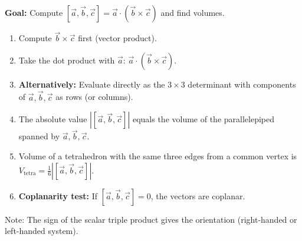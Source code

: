 \documentclass[11pt]{article}
\newcommand{\cle}[1]{{\popxbold\color{popdark}#1}}
\begin{document}
\begin{methode}
\textbf{Goal:} Compute $[\vec{a},\vec{b},\vec{c}]=\vec{a}\cdot(\vec{b}\times\vec{c})$ and find volumes.
\begin{enumerate}
\item Compute $\vec{b}\times\vec{c}$ first (vector product).
\item Take the dot product with $\vec{a}$: $\vec{a}\cdot(\vec{b}\times\vec{c})$.
\item \textbf{Alternatively:} Evaluate directly as the $3\times3$ determinant with components of $\vec{a},\vec{b},\vec{c}$ as rows (or columns).
\item The absolute value $|[\vec{a},\vec{b},\vec{c}]|$ equals the volume of the parallelepiped spanned by $\vec{a},\vec{b},\vec{c}$.
\item Volume of a tetrahedron with the same three edges from a common vertex is $V_{\text{tetra}}=\frac16|[\vec{a},\vec{b},\vec{c}]|$.
\item \textbf{Coplanarity test:} If $[\vec{a},\vec{b},\vec{c}]=0$, the vectors are coplanar.
\end{enumerate}
\cle{Note:} The sign of the scalar triple product gives the orientation (right-handed or left-handed system).
\end{methode}
\end{document}
